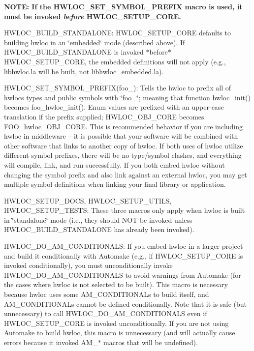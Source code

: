 \begin{DoxyItemize}
{\bfseries N\+O\+TE\+: If the H\+W\+L\+O\+C\+\_\+\+S\+E\+T\+\_\+\+S\+Y\+M\+B\+O\+L\+\_\+\+P\+R\+E\+F\+IX macro is used, it must be invoked {\itshape before} H\+W\+L\+O\+C\+\_\+\+S\+E\+T\+U\+P\+\_\+\+C\+O\+RE.}
\item H\+W\+L\+O\+C\+\_\+\+B\+U\+I\+L\+D\+\_\+\+S\+T\+A\+N\+D\+A\+L\+O\+NE\+: H\+W\+L\+O\+C\+\_\+\+S\+E\+T\+U\+P\+\_\+\+C\+O\+RE defaults to building hwloc in an \char`\"{}embedded\char`\"{} mode (described above). If H\+W\+L\+O\+C\+\_\+\+B\+U\+I\+L\+D\+\_\+\+S\+T\+A\+N\+D\+A\+L\+O\+NE is invoked $\ast$before$\ast$ H\+W\+L\+O\+C\+\_\+\+S\+E\+T\+U\+P\+\_\+\+C\+O\+RE, the embedded definitions will not apply (e.\+g., libhwloc.\+la will be built, not libhwloc\+\_\+embedded.\+la).
\item H\+W\+L\+O\+C\+\_\+\+S\+E\+T\+\_\+\+S\+Y\+M\+B\+O\+L\+\_\+\+P\+R\+E\+F\+I\+X(foo\+\_\+)\+: Tells the hwloc to prefix all of hwloc\textquotesingle{}s types and public symbols with \char`\"{}foo\+\_\+\char`\"{}; meaning that function hwloc\+\_\+init() becomes foo\+\_\+hwloc\+\_\+init(). Enum values are prefixed with an upper-\/case translation if the prefix supplied; H\+W\+L\+O\+C\+\_\+\+O\+B\+J\+\_\+\+C\+O\+RE becomes F\+O\+O\+\_\+hwloc\+\_\+\+O\+B\+J\+\_\+\+C\+O\+RE. This is recommended behavior if you are including hwloc in middleware -- it is possible that your software will be combined with other software that links to another copy of hwloc. If both uses of hwloc utilize different symbol prefixes, there will be no type/symbol clashes, and everything will compile, link, and run successfully. If you both embed hwloc without changing the symbol prefix and also link against an external hwloc, you may get multiple symbol definitions when linking your final library or application.
\item H\+W\+L\+O\+C\+\_\+\+S\+E\+T\+U\+P\+\_\+\+D\+O\+CS, H\+W\+L\+O\+C\+\_\+\+S\+E\+T\+U\+P\+\_\+\+U\+T\+I\+LS, H\+W\+L\+O\+C\+\_\+\+S\+E\+T\+U\+P\+\_\+\+T\+E\+S\+TS\+: These three macros only apply when hwloc is built in \char`\"{}standalone\char`\"{} mode (i.\+e., they should N\+OT be invoked unless H\+W\+L\+O\+C\+\_\+\+B\+U\+I\+L\+D\+\_\+\+S\+T\+A\+N\+D\+A\+L\+O\+NE has already been invoked).
\item H\+W\+L\+O\+C\+\_\+\+D\+O\+\_\+\+A\+M\+\_\+\+C\+O\+N\+D\+I\+T\+I\+O\+N\+A\+LS\+: If you embed hwloc in a larger project and build it conditionally with Automake (e.\+g., if H\+W\+L\+O\+C\+\_\+\+S\+E\+T\+U\+P\+\_\+\+C\+O\+RE is invoked conditionally), you must unconditionally invoke H\+W\+L\+O\+C\+\_\+\+D\+O\+\_\+\+A\+M\+\_\+\+C\+O\+N\+D\+I\+T\+I\+O\+N\+A\+LS to avoid warnings from Automake (for the cases where hwloc is not selected to be built). This macro is necessary because hwloc uses some A\+M\+\_\+\+C\+O\+N\+D\+I\+T\+I\+O\+N\+A\+Ls to build itself, and A\+M\+\_\+\+C\+O\+N\+D\+I\+T\+I\+O\+N\+A\+Ls cannot be defined conditionally. Note that it is safe (but unnecessary) to call H\+W\+L\+O\+C\+\_\+\+D\+O\+\_\+\+A\+M\+\_\+\+C\+O\+N\+D\+I\+T\+I\+O\+N\+A\+LS even if H\+W\+L\+O\+C\+\_\+\+S\+E\+T\+U\+P\+\_\+\+C\+O\+RE is invoked unconditionally. If you are not using Automake to build hwloc, this macro is unnecessary (and will actually cause errors because it invoked A\+M\+\_\+$\ast$ macros that will be undefined).
\end{DoxyItemize}
